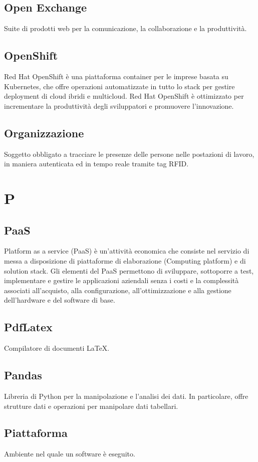 \subsection{Open Exchange} Suite di prodotti web per la comunicazione, la collaborazione e la produttività.
\subsection{OpenShift} Red Hat OpenShift è una piattaforma container per le imprese basata su Kubernetes, che offre operazioni automatizzate in tutto lo stack per gestire deployment di cloud ibridi e multicloud. Red Hat OpenShift è ottimizzato per incrementare la produttività degli sviluppatori e promuovere l'innovazione. 
\subsection{Organizzazione} Soggetto obbligato a tracciare le presenze delle persone nelle postazioni di lavoro, in maniera autenticata ed in tempo reale tramite tag RFID. 
\newpage \section{P}
\subsection{PaaS} Platform as a service (PaaS) è un'attività economica che consiste nel servizio di messa a disposizione di piattaforme di elaborazione (Computing platform) e di solution stack. Gli elementi del PaaS permettono di sviluppare, sottoporre a test, implementare e gestire le applicazioni aziendali senza i costi e la complessità associati all'acquisto, alla configurazione, all'ottimizzazione e alla gestione dell'hardware e del software di base.
\subsection{PdfLatex} Compilatore di documenti \LaTeX.
\subsection{Pandas} Libreria di Python per la manipolazione e l'analisi dei dati. In particolare, offre strutture dati e operazioni per manipolare dati tabellari.
\subsection{Piattaforma} Ambiente nel quale un software è eseguito.

